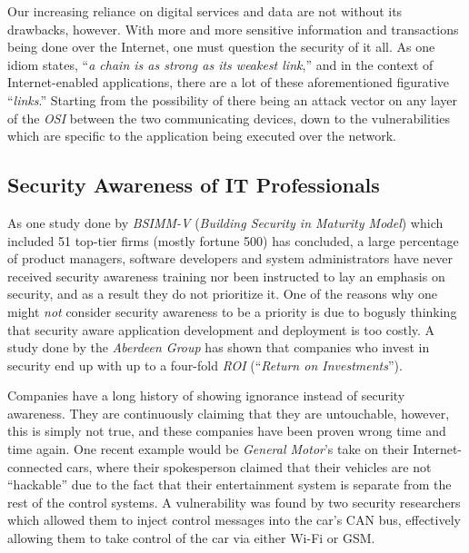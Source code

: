 \documentclass[a4paper,12pt]{article}
\begin{document}
	Our increasing reliance on digital services and data are not without its drawbacks, however. With more and more sensitive information and transactions being done over the Internet, one must question the security of it all. As one idiom states, ``\textit{a chain is as strong as its weakest link},'' and in the context of Internet-enabled applications, there are a lot of these aforementioned figurative ``\textit{links}.'' Starting from the possibility of there being an attack vector on any layer of the \textit{OSI} between the two communicating devices, down to the vulnerabilities which are specific to the application being executed over the network.
	
\subsection{Security Awareness of IT Professionals}
 
	
	As one study done by \textit{BSIMM-V} (\textit{Building Security in Maturity Model}) which included 51 top-tier firms (mostly fortune 500) has concluded\cite{gmcgraw12}, a large percentage of product managers, software developers and system administrators have never received security awareness training nor been instructed to lay an emphasis on security, and as a result they do not prioritize it. One of the reasons why one might \textit{not} consider security awareness to be a priority is due to bogusly thinking that security aware application development and deployment is too costly. A study done by the \textit{Aberdeen Group} has shown that companies who invest in security end up with up to a four-fold \textit{ROI} (``\textit{Return on Investments}'').\cite{aberdeen11}
	
	Companies have a long history of showing ignorance instead of security awareness. They are continuously claiming that they are untouchable, however, this is simply not true, and these companies have been proven wrong time and time again. One recent example would be \textit{General Motor}'s take on their Internet-connected cars, where their spokesperson claimed that their vehicles are not ``hackable'' due to the fact that their entertainment system is separate from the rest of the control systems. A vulnerability was found by two security researchers\cite{cmiller15} which allowed them to inject control messages into the car's CAN bus, effectively allowing them to take control of the car via either Wi-Fi or GSM.
	
\end{document}
